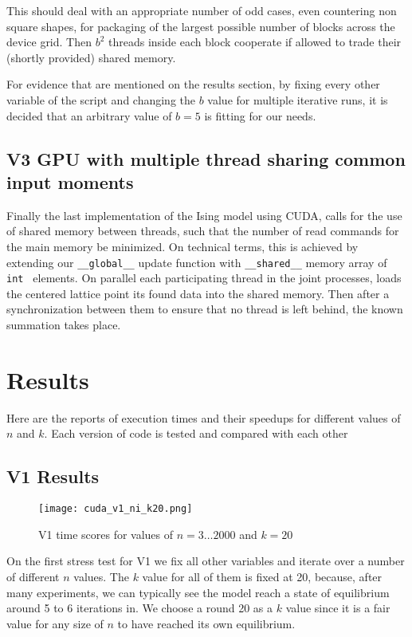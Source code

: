 \documentclass[twocolumn]{article}
\begin{document}
This should deal with an appropriate number of odd cases, even countering non square shapes, for packaging of the largest possible number of blocks across the device grid. Then $b^2$ threads inside each block cooperate if allowed to trade their (shortly provided) shared memory.

For evidence that are mentioned on the results section, by fixing every other variable of the script and changing the $b$ value for multiple iterative runs, it is decided that an arbitrary value of $b = 5$ is fitting for our needs.
\subsection{V3 GPU with multiple thread sharing common input moments}
Finally the last implementation of the Ising model using CUDA, calls for the use of shared memory between threads, such that the number of read commands for the main memory be minimized. On technical terms, this is achieved by extending our \texttt{\_\_global\_\_} update function with \texttt{\_\_shared\_\_} memory array of \texttt{ int } elements. On parallel each participating thread in the joint processes, loads the centered lattice point its found data into the shared memory. Then after a synchronization between them to ensure that no thread is left behind, the known summation takes place.

\section{Results}
Here are the reports of execution times and their speedups for different values of $n$ and $k$. Each version of code is tested and compared with each other
\subsection{V1 Results}

\begin{figure}[htbp]
    \centering
    \texttt{[image: cuda\_v1\_ni\_k20.png]}
    \caption{V1 time scores for values of $n = 3 \dots 2000 $ and $k = 20$ }
    \label{fig:cuda_v1_ni_k20}
\end{figure}

On the first stress test for V1 we fix all other variables and iterate over a number of different $n$ values. The $k$ value for all of them is fixed at 20, because, after many experiments, we can typically see the model reach a state of equilibrium around 5 to 6 iterations in. We choose a round 20 as a $k$ value since it is a fair value for any size of $n$ to have reached its own equilibrium.
\end{document}
